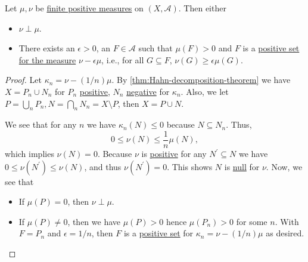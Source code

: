 \begin{lemma}\label{lma:finite-singular}
	Let \(\mu, \nu\) be \hyperref[def:finite-signed-measure]{finite positive measures} on \((X, \mathcal{A})\). Then either
	\begin{itemize}
		\item \(\nu \perp \mu\).
		\item There exists an \(\epsilon > 0\), an \(F \in \mathcal{A}\) such that \(\mu(F) > 0\) and \(F\) is a
		      \hyperref[def:positive-set-for-a-signed-measure]{positive set for the measure} \(\nu - \epsilon \mu\),
		      i.e., for all \(G \subseteq F\), \(\nu(G) \geq \epsilon \mu(G)\).
	\end{itemize}
\end{lemma}

\begin{proof}
	Let \(\kappa_n = \nu - (1/n)\mu\). By \autoref{thm:Hahn-decomposition-theorem} we have \(X = P_n \cup N_n\) for \(P_n\)
	\hyperref[def:positive-set-for-a-signed-measure]{positive}, \(N_n\) \hyperref[def:negative-set-for-a-signed-measure]{negative}
	for \(\kappa _n\). Also, we let \(P = \bigcup_n P_n, N = \bigcap_n N_n = X \setminus P\), then \(X = P \cup N\).

	We see that for any \(n\) we have \(\kappa_n(N) \leq 0\) because \(N \subseteq N_n\). Thus,
	\[
		0 \leq \nu(N) \leq \frac{1}{n}\mu(N),
	\]
	which implies \(\nu(N) = 0\). Because \(\nu\) is \hyperref[def:signed-measure]{positive} for any \(N^\prime  \subseteq N\) we have \(0 \leq \nu(N^\prime ) \leq \nu(N)\),
	and thus \(\nu(N^\prime ) = 0\). This shows \(N\) is \hyperref[def:null-set-for-a-signed-measure]{null} for \(\nu \). Now, we see that
	\begin{itemize}
		\item If \(\mu(P) = 0\), then \(\nu \perp \mu\).
		\item If \(\mu(P) \neq 0\), then we have \(\mu (P) > 0\) hence \(\mu(P_n) > 0\) for some \(n\). With \(F = P_n\) and \(\epsilon = 1/n\), then \(F\) is a
		      \hyperref[def:positive-set-for-a-signed-measure]{positive set} for \(\kappa_n = \nu - (1/n)\mu\) as desired.
	\end{itemize}
\end{proof}

